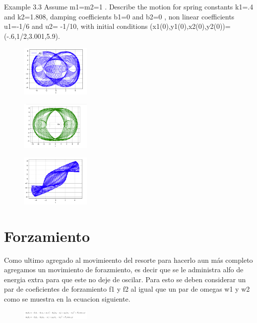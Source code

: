 \documentclass[a4paper]{article}
\begin{document}
Example 3.3 Assume m1=m2=1 . Describe the motion for spring constants k1=.4 and k2=1.808, damping coefficients b1=0 and b2=0 , non linear coefficients u1=-1/6 and u2= -1/10,   with   initial   conditions (x1(0),y1(0),x2(0),y2(0))=(-.6,1/2,3.001,5.9).

\begin{figure}[ht!]
\centering
\includegraphics[width=0.3\textwidth]{331.png}
\end{figure}

\begin{figure}[ht!]
\centering
\includegraphics[width=0.3\textwidth]{332.png}
\end{figure}

\begin{figure}[ht!]
\centering
\includegraphics[width=0.3\textwidth]{333.png}
\end{figure}
\newpage

\section{Forzamiento}
Como ultimo agregado al movimieento del resorte para hacerlo aun más completo agregamos un movimiento de forazmiento, es decir que se le administra alfo de energia extra para que este no deje de oscilar. Para esto se deben considerar un par de coeficientes de forzamiento f1 y f2 al igual que un par de omegas w1 y w2 como se muestra en la ecuacion siguiente. 

\begin{figure}[ht!]
\centering
\includegraphics[width=0.3\textwidth]{E3.png}
\end{figure}
\end{document}

